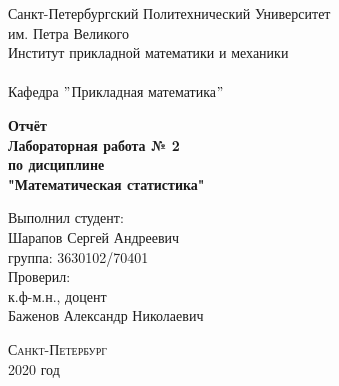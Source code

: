 \documentclass[a4]{article}
\begin{document}
	\def\contentsname{\LARGE{Содержание}}
	\thispagestyle{empty}
	\begin{center} 
		\vspace{2cm} 
		{\Large \sc Санкт-Петербургский Политехнический Университет}\\
		\vspace{2mm}
		{\Large\sc им. Петра Великого}\\
		\vspace{1cm}
		{\large \sc Институт прикладной математики и механики\\ 
			\vspace{0.5mm}
			\textsc{}}\\ 
		\vspace{0.5mm}
		{\large\sc Кафедра $"$Прикладная математика$"$}\\
		\vspace{15mm}
		
		
		{\sc \textbf{Отчёт\\
			Лабораторная работа № 2\\
			по дисциплине\\
			"Математическая статистика"}
			\vspace{6mm}
			
		}
		\vspace*{2mm}
		
		
		\begin{flushleft}
			\vspace{4cm}
			\sc Выполнил студент:\\
			\sc Шарапов Сергей Андреевич\\
			\sc группа: 3630102/70401\\
			\vspace{1cm}
			\sc Проверил:\\
			\sc к.ф-м.н., доцент\\
			\sc Баженов Александр Николаевич
			\vspace{20mm}
		\end{flushleft}
	\end{center} 
	\begin{center}
		\vfill {\large\textsc{Санкт-Петербург}}\\ 
		2020 год
	\end{center}
	
	\newpage
	\pagestyle{plain}
	
	
	
\end{document}
